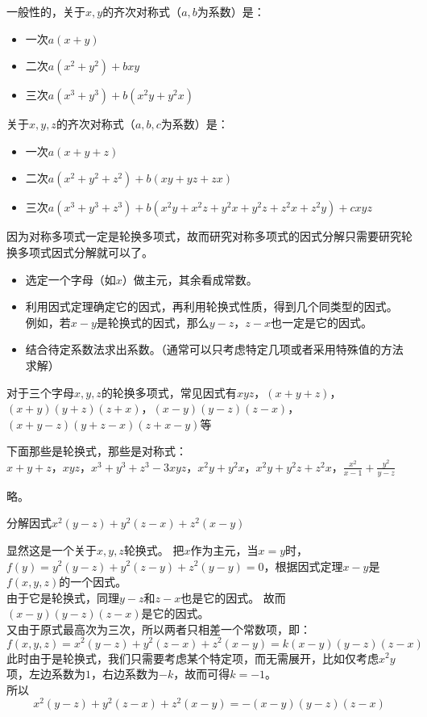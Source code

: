 \documentclass[windows,csize4,answers]{BHCexam}
\begin{document}
\begin{groups}
    一般性的，关于$x,y$的齐次对称式（$a,b$为系数）是：
    \begin{itemize}
        \item 一次$a(x+y)$
        \item 二次$a(x^2+y^2)+bxy$
        \item 三次$a(x^3+y^3)+b(x^2y+y^2x)$
    \end{itemize}
    关于$x,y,z$的齐次对称式（$a,b,c$为系数）是：
    \begin{itemize}
        \item 一次$a(x+y+z)$
        \item 二次$a(x^2+y^2+z^2)+b(xy+yz+zx)$
        \item 三次$a(x^3+y^3+z^3)+b(x^2y+x^2z+y^2x+y^2z+z^2x+z^2y)+cxyz$
    \end{itemize}

    因为对称多项式一定是轮换多项式，故而研究对称多项式的因式分解只需要研究轮换多项式因式分解就可以了。
    \begin{itemize}
        \item 选定一个字母（如$x$）做主元，其余看成常数。
        \item 利用因式定理确定它的因式，再利用轮换式性质，得到几个同类型的因式。
              例如，若$x-y$是轮换式的因式，那么$y-z$，$z-x$也一定是它的因式。
        \item 结合待定系数法求出系数。（通常可以只考虑特定几项或者采用特殊值的方法求解）
    \end{itemize}
    对于三个字母$x,y,z$的轮换多项式，常见因式有$xyz$，$(x+y+z)$，$(x+y)(y+z)(z+x)$，$(x-y)(y-z)(z-x)$，
    $(x+y-z)(y+z-x)(z+x-y)$等


    \begin{questions}[]
        \question[5] 下面那些是轮换式，那些是对称式：\\
        $x+y+z$，$xyz$，$x^3+y^3+z^3-3xyz$，$x^2y+y^2x$，$x^2y+y^2z+z^2x$，$\frac{x^2}{x-1}+\frac{y^2}{y-z}$
        \begin{solution}{0.5cm}
            \methodonly 略。
        \end{solution}
        \vspace{3.5cm}

        \question[5] 分解因式$x^2(y-z)+y^2(z-x)+z^2(x-y)$
        \begin{solution}{0.5cm}
            \methodonly 显然这是一个关于$x,y,z$轮换式。
            把$x$作为主元，当$x=y$时，$f(y)=y^2(y-z)+y^2(z-y)+z^2(y-y)=0$，根据因式定理$x-y$是$f(x,y,z)$的一个因式。 \\
            由于它是轮换式，同理$y-z$和$z-x$也是它的因式。 故而$(x-y)(y-z)(z-x)$是它的因式。\\
            又由于原式最高次为三次，所以两者只相差一个常数项，即： \\
            \[
                f(x,y,z)= x^2(y-z)+y^2(z-x)+z^2(x-y) = k(x-y)(y-z)(z-x)
            \]
            此时由于是轮换式，我们只需要考虑某个特定项，而无需展开，比如仅考虑$x^2y$项，左边系数为$1$，右边系数为$-k$，故而可得$k=-1$。 \\
            所以
            \[
                x^2(y-z)+y^2(z-x)+z^2(x-y) = -(x-y)(y-z)(z-x)
            \]


\end{solution}
\end{questions}
\end{groups}
\end{document}
